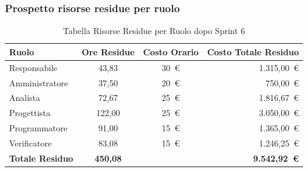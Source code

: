 \subsubsection{Prospetto risorse residue per ruolo}
\begin{table}[H]
    \centering
    \renewcommand{\arraystretch}{1.3}
    \begin{tabularx}{\textwidth}{|X|c|c|r|}
        \hline
        \textbf{Ruolo} & \textbf{Ore Residue} & \textbf{Costo Orario} &
        \textbf{Costo Totale Residuo} \\
        \hline
        Responsabile   & 43,83 & 30~\euro & 1.315{,}00~\euro \\
        Amministratore & 37,50 & 20~\euro &   750{,}00~\euro \\
        Analista       & 72,67 & 25~\euro & 1.816{,}67~\euro \\
        Progettista    & 122,00 & 25~\euro & 3.050{,}00~\euro \\
        Programmatore  & 91,00 & 15~\euro & 1.365{,}00~\euro \\
        Verificatore   & 83,08 & 15~\euro & 1.246{,}25~\euro \\
        \hline
        \textbf{Totale Residuo} & \textbf{450,08} & &
        \textbf{9.542{,}92~\euro} \\
        \hline
    \end{tabularx}
    \caption{Tabella Risorse Residue per Ruolo dopo Sprint 6}
\end{table}

